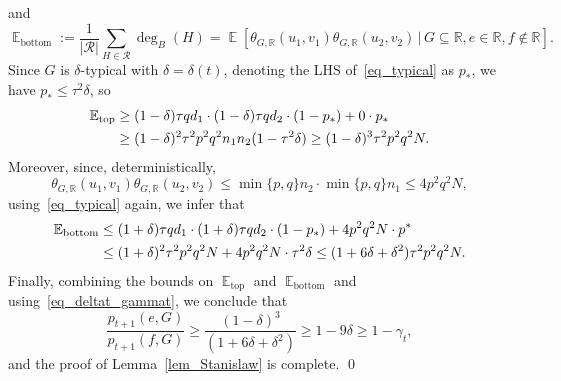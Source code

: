 \documentclass[12pt,reqno]{amsart}
\newcommand{\E}{\operatorname{\mathbb{E}}}
\newcommand{\rc}{{\mathcal{R}}}
\newcommand{\Ec}[2]{\E\left[#1\,|\,#2\right]}
\newcommand{\R} {\mathbb R}
\theoremstyle{definition}
\newcommand{\deltat}{\delta(t)}
\newcommand{\lhs}{LHS}
\begin{document}
and
\begin{equation*}
	\E_{\text{bottom}} := \frac1{|\rc|}\sum_{H\in\rc}\deg_B(H)= \Ec{\theta_{G,\R}(u_1,v_1)\theta_{G,\R}(u_2,v_2)}{G \subseteq \R, e \in \R, f \notin \R}.
\end{equation*}
Since $G$ is $\delta$-typical with $\delta = \deltat$,
denoting the \lhs{} of~\eqref{eq_typical} as $p_*$,
we have $p_* \le \tau^2 \delta$, so
\begin{align}
  \notag \E_{\text{top}}
  &\ge (1 - \delta) \tau qd_1 \cdot (1 - \delta)\tau qd_2 \cdot (1 - p_*) + 0 \cdot p_*
  \\
  \label{eq_top_bound} &\ge (1 - \delta)^2 \tau^2p^2q^2n_1n_2(1 - \tau^2\delta )
  \ge (1 - \delta)^3 \tau^2p^2q^2N.
\end{align}
Moreover, since, deterministically,
\begin{equation*}
  \theta_{G,\R}(u_1, v_1)\theta_{G, \R}(u_2, v_2) \le \min\{p,q\} n_2\cdot \min\{p,q\}n_1 \le 4p^2q^2N,
\end{equation*}
using~\eqref{eq_typical} again, we infer that
\begin{align}
  \E_{\text{bottom}}
  \notag &\le (1 + \delta) \tau qd_1 \cdot (1 + \delta)\tau qd_2 \cdot (1 - p_*) + 4p^2q^2N \cdot p^*\\
  \label{eq_bottom_bound} &\le (1 + \delta)^2\tau^2p^2q^2N + 4p^2q^2N \cdot \tau^2\delta \le (1 + 6\delta + \delta^2)\tau^2p^2q^2N .
\end{align}
Finally, combining the bounds on $\E_{\text{top}}$ and $\E_{\text{bottom}}$ and using~\eqref{eq_deltat_gammat}, we conclude that
\begin{equation}
\label{eq_p_ratio}
  \frac{p_{t+1}(e,G)}{p_{t+1}(f,G)}
  \ge \frac{(1 - \delta)^3}{(1 + 6 \delta + \delta^2)} \ge 1 - 9\delta \ge  1 - \gamma_t,
\end{equation}
and the proof of Lemma~\ref{lem_Stanislaw} is complete. \qed
\end{document}
